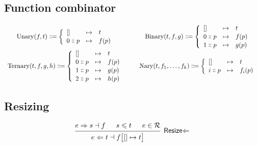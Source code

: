 \documentclass{article}
\DeclareMathOperator{\Binary}{Binary}
\DeclareMathOperator{\Unary}{Unary}
\DeclareMathOperator{\Ternary}{Ternary}
\DeclareMathOperator{\Nary}{Nary}
\newcommand{\Syn}{\ensuremath{\Rightarrow}}
\newcommand{\Chk}{\ensuremath{\Leftarrow}}
\newcommand{\s}[3]{\ensuremath{#1 \Syn{} #2 \dashv{} #3}}
\renewcommand{\c}[3]{\ensuremath{#1 \Chk{} #2 \dashv{} #3}}
\begin{document}
\subsection*{Function combinator}
\begin{equation*}
  \renewcommand\arraystretch{1.1}
  \begin{array}{ccc}
    \Unary(f, t) \Coloneq \left\{
    \begin{array}{lcl}
      {[]}          & \mapsto & t     \\
      0 \dblcolon p & \mapsto & f (p)
    \end{array}
    \right.
     & \hspace{.5em} &
    \Binary(t, f, g) \Coloneq \left\{
    \begin{array}{lcl}
      {[]}          & \mapsto & t     \\
      0 \dblcolon p & \mapsto & f (p) \\
      1 \dblcolon p & \mapsto & g (p)
    \end{array}
    \right.
    \\[1em]
    \Ternary(t, f, g, h) \Coloneq \left\{
    \begin{array}{lcl}
      {[]}          & \mapsto & t     \\
      0 \dblcolon p & \mapsto & f (p) \\
      1 \dblcolon p & \mapsto & g (p) \\
      2 \dblcolon p & \mapsto & h (p)
    \end{array}
    \right.
     & \hspace{.5em} &
    \Nary(t, f_1, \dots, f_k) \Coloneq \left\{
    \begin{array}{lcl}
      {[]}          & \mapsto & t       \\
      i \dblcolon p & \mapsto & f_i (p)
    \end{array}
    \right.
  \end{array}
\end{equation*}

\subsection*{Resizing}

\begin{equation*}
  \begin{prooftree}
    \hypo{\s{e}{s}{f}}
    \hypo{s \leqslant t}
    \hypo{e \in \mathcal{R}}
    \infer3[\textsf{Resize\Chk}]{\c{e}{t}{f\big[{[]}\mapsto t\big]}}
  \end{prooftree}
\end{equation*}
\end{document}
